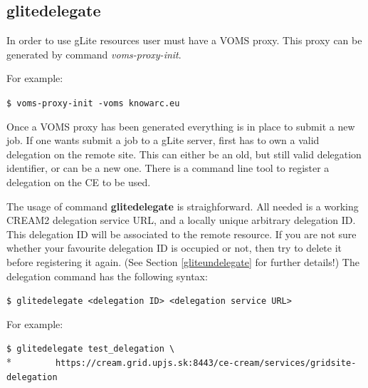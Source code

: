 \documentclass{article}
\begin{document}
\subsection{glitedelegate}
\label{glitedelegate}
In order to use gLite resources user must have a VOMS proxy. This proxy can be generated by command \textit{voms-proxy-init}.\par
For example:
\begin{shaded}\verb#$ voms-proxy-init -voms knowarc.eu#\end{shaded}
Once a VOMS proxy has been generated everything is in place to submit a new job. If one wants submit a job to a gLite server, first has to own a valid delegation on the remote site. This can either be an old, but still valid delegation identifier, or can be a new one. There is a command line tool to register a delegation on the CE to be used.\par
The usage of command \textbf{glitedelegate} is straighforward. All needed is a working CREAM2 delegation service URL, and a locally unique arbitrary delegation ID. This delegation ID will be associated to the remote resource. If you are not sure whether your favourite delegation ID is occupied or not, then try to delete it before registering it again. (See Section \ref{gliteundelegate} for further details!) The delegation command has the following syntax:
\begin{shaded}\verb#$ glitedelegate <delegation ID> <delegation service URL>#\end{shaded}
For example:
\begin{shaded}\verb#$ glitedelegate test_delegation \#\\*
\verb#        https://cream.grid.upjs.sk:8443/ce-cream/services/gridsite-delegation#\end{shaded}
\end{document}
